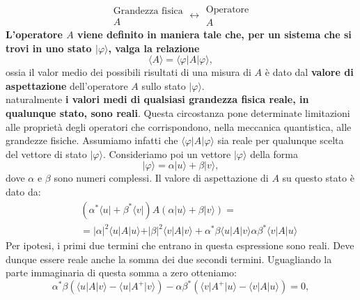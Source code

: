 \documentclass[a4paper,12pt,oneside]{book}
\begin{document}
\begin{equation}
\begin{array}{c}
\textrm{Grandezza fisica}\\
A
\end{array}
\longleftrightarrow
\begin{array}{c}
\textrm{Operatore}\\
A
\end{array}
\end{equation}
\textbf{L'operatore $A$ viene definito in maniera tale che, per un sistema che si trovi in uno stato $\vert \varphi \rangle $, valga la relazione}
\begin{equation}
\langle A \rangle = \langle \varphi \vert A \vert \varphi \rangle,
\end{equation}
ossia il valor medio dei possibili risultati di una misura di $A$ è dato dal \textbf{valore di aspettazione} dell'operatore $A$ sullo stato $\vert \varphi \rangle$.\\
naturalmente \textbf{i valori medi di qualsiasi grandezza fisica reale, in qualunque stato, sono reali}. Questa circostanza pone determinate limitazioni alle proprietà degli operatori che corrispondono, nella meccanica quantistica, alle grandezze fisiche. Assumiamo infatti che $\langle \varphi \vert A \vert \varphi \rangle$ sia reale per qualunque scelta del vettore di stato $\vert \varphi \rangle$. Consideriamo poi un vettore $\vert \varphi \rangle$ della forma
\begin{equation}
\vert \varphi \rangle = \alpha \vert u \rangle + \beta \vert v \rangle,
\end{equation}
dove $\alpha$ e $\beta$ sono numeri complessi. Il valore di aspettazione di $A$ su questo stato è dato da:
\begin{eqnarray}
& &\left( \alpha ^* \langle u \vert + \beta ^* \langle v \vert \right) A \left(\alpha \vert u \rangle + \beta \vert v \rangle \right) = \nonumber \\
& &=\vert \alpha \vert ^2 \langle u \vert A \vert u \rangle + \vert \beta \vert ^2 \langle v \vert A \vert v \rangle + \alpha ^* \beta \langle u \vert A \vert v \rangle \alpha  \beta ^* \langle v \vert A \vert u \rangle
\end{eqnarray}
Per ipotesi, i primi due termini che entrano in questa espressione sono reali. Deve dunque essere reale anche la somma dei due secondi termini. Uguagliando la parte immaginaria di questa somma a zero otteniamo:
\begin{equation}
\label{eq:cap4_1}
\alpha ^* \beta \left(\langle u \vert A \vert v \rangle -\langle u \vert A^{+} \vert v \rangle \right)-  \alpha  \beta ^* \left( \langle v \vert A^{+} \vert u \rangle -\langle v \vert A \vert u \rangle \right) =0, 
\end{equation}
\end{document}
